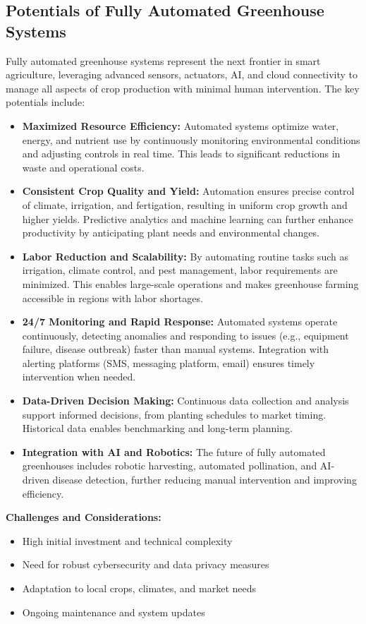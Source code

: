 \documentclass[12pt,a4paper]{article}
\begin{document}
\subsection{Potentials of Fully Automated Greenhouse Systems}
Fully automated greenhouse systems represent the next frontier in smart agriculture, leveraging advanced sensors, actuators, AI, and cloud connectivity to manage all aspects of crop production with minimal human intervention. The key potentials include:
\begin{itemize}
    \item \textbf{Maximized Resource Efficiency:} Automated systems optimize water, energy, and nutrient use by continuously monitoring environmental conditions and adjusting controls in real time. This leads to significant reductions in waste and operational costs.
    \item \textbf{Consistent Crop Quality and Yield:} Automation ensures precise control of climate, irrigation, and fertigation, resulting in uniform crop growth and higher yields. Predictive analytics and machine learning can further enhance productivity by anticipating plant needs and environmental changes.
    \item \textbf{Labor Reduction and Scalability:} By automating routine tasks such as irrigation, climate control, and pest management, labor requirements are minimized. This enables large-scale operations and makes greenhouse farming accessible in regions with labor shortages.
    \item \textbf{24/7 Monitoring and Rapid Response:} Automated systems operate continuously, detecting anomalies and responding to issues (e.g., equipment failure, disease outbreak) faster than manual systems. Integration with alerting platforms (SMS, messaging platform, email) ensures timely intervention when needed.
    \item \textbf{Data-Driven Decision Making:} Continuous data collection and analysis support informed decisions, from planting schedules to market timing. Historical data enables benchmarking and long-term planning.
    \item \textbf{Integration with AI and Robotics:} The future of fully automated greenhouses includes robotic harvesting, automated pollination, and AI-driven disease detection, further reducing manual intervention and improving efficiency.
\end{itemize}
\textbf{Challenges and Considerations:}
\begin{itemize}
    \item High initial investment and technical complexity
    \item Need for robust cybersecurity and data privacy measures
    \item Adaptation to local crops, climates, and market needs
    \item Ongoing maintenance and system updates
\end{itemize}
\end{document}
